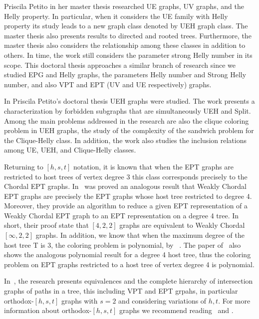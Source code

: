 Priscila Petito in her master thesis \cite{petito2002grafos} researched UE graphs, UV graphs, and the Helly property. In particular, when it considers the UE family with Helly property its study leads to a new graph class denoted by UEH graph class. The master thesis also presents results to directed and rooted trees. Furthermore, the master thesis also considers the relationship among these classes in addition to others. In time, the work still considers the parameter strong Helly number in its scope. This doctoral thesis approaches a similar branch of research since we studied EPG and Helly graphs, the parameters Helly number and Strong Helly number, and also VPT and EPT (UV and UE respectively) graphs.

 
 
 In Priscila Petito's doctoral thesis  \cite{petito2009grafos} UEH graphs  were studied. The work presents a characterization by forbidden subgraphs that are simultaneously UEH and Split.  Among the main problems addressed in the research are also the clique coloring problem in UEH graphs,  the study of the complexity of the sandwich problem for the Clique-Helly class. In addition, the work also studies the inclusion relations among UE, UEH, and Clique-Helly classes.

Returning to $[h,s,t]$ notation, it is known that when the EPT graphs are restricted to host trees of vertex degree 3 this class corresponds precisely to the Chordal EPT graphs. In~\citet{golumbic2008representing} was  proved an analogous result that Weakly Chordal EPT graphs are precisely the EPT graphs whose host tree restricted to degree 4. Moreover, they provide an algorithm to reduce a given EPT representation of a Weakly Chordal EPT graph to an EPT representation on a degree 4 tree. In short, their proof state that  $[4, 2, 2]$ graphs are equivalent to Weakly Chordal $[\infty, 2, 2]$ graphs. In addition, we know that when the maximum degree of the host tree T is 3, the coloring problem is polynomial, by
~\cite{golumbic1985}. The paper of~\cite{golumbic2008representing} also shows the analogous polynomial result for a degree 4 host tree, thus the coloring problem on EPT graphs restricted to a host tree of vertex degree 4 is polynomial.

In~\citet{golumbic2008equivalences}, the research presents equivalences and the complete hierarchy of intersection graphs of paths in a tree, this including VPT and EPT grpahs, in particular orthodox-$[h,s,t]$ graphs with $s=2$ and considering variations of $h,t$. For more information about orthodox-$[h,s,t]$ graphs we recommend reading~\citet{jamison2005constant} and \citet{jose2018}.

